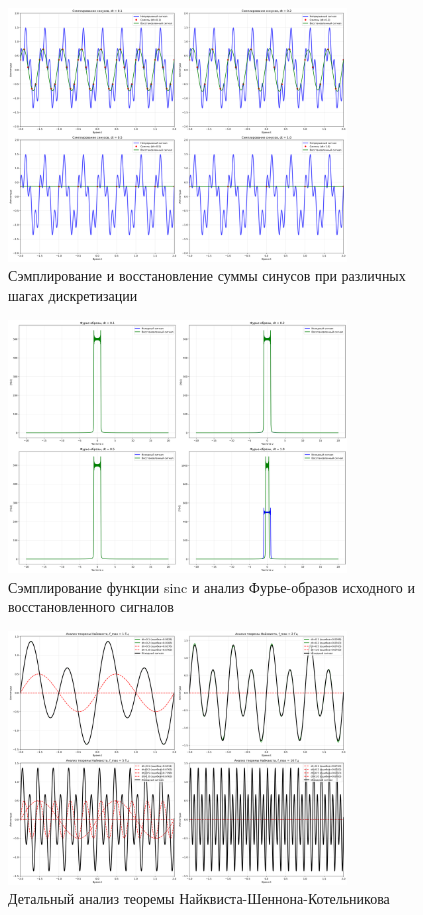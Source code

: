 \begin{figure}[H]
    \centering
    \includegraphics[width=0.8\textwidth]{images/task2/sampling_sines.png}
    \caption{Сэмплирование и восстановление суммы синусов при различных шагах дискретизации}
    \label{fig:sampling_sines}
\end{figure}

\begin{figure}[H]
    \centering
    \includegraphics[width=0.8\textwidth]{images/task2/sampling_sinc_fourier.png}
    \caption{Сэмплирование функции sinc и анализ Фурье-образов исходного и восстановленного сигналов}
    \label{fig:sampling_sinc_fourier}
\end{figure}

\begin{figure}[H]
    \centering
    \includegraphics[width=0.8\textwidth]{images/task2/nyquist_analysis.png}
    \caption{Детальный анализ теоремы Найквиста-Шеннона-Котельникова}
    \label{fig:nyquist_analysis}
\end{figure}

